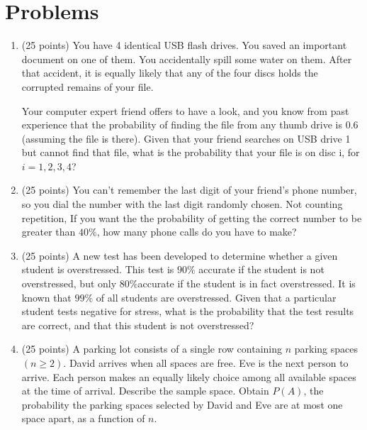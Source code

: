 \documentclass[12pt, oneside]{article}
\begin{document}
\section{Problems}
\begin{enumerate}

\item (25 points) You have 4 identical USB flash drives. You saved an important document on one of them. You accidentally spill some water on them. After that accident, it is equally likely that any of the four discs holds the corrupted remains of your file.

Your computer expert friend offers to have a look, and you know from past experience that the probability of finding the file from any thumb drive is 0.6 (assuming the file is there). Given that your friend searches on USB drive 1 but cannot find that file, what is the probability that your file is on disc i, for $i=1,2,3,4$?

\newpage
\item (25 points) You can't remember the last digit of your friend's phone number, so you dial the number with the last digit randomly chosen. Not counting repetition, If you want the the probability of getting the correct number to be greater than $40\%$, how many phone calls do you have to make?
\newpage
\item (25 points) A new test has been developed to determine whether a given student is overstressed. This test is $90\%$ accurate if the student is not overstressed, but only $80\%$accurate if the student is in fact overstressed. It is known that $99\%$ of all students are overstressed. Given that a particular student tests negative for stress, what is the probability that the test results are correct, and that this student is not overstressed?
\newpage
\item (25 points) A parking lot consists of a single row containing $n$ parking spaces $(n\geq2)$. David arrives when all spaces are free. Eve is the next person to arrive. Each person makes an equally likely choice among all available spaces at the time of arrival. Describe the sample space. Obtain $P(A)$, the probability the parking spaces selected by David and Eve are at most one space apart, as a function of $n$.
\end{enumerate}
\end{document}
